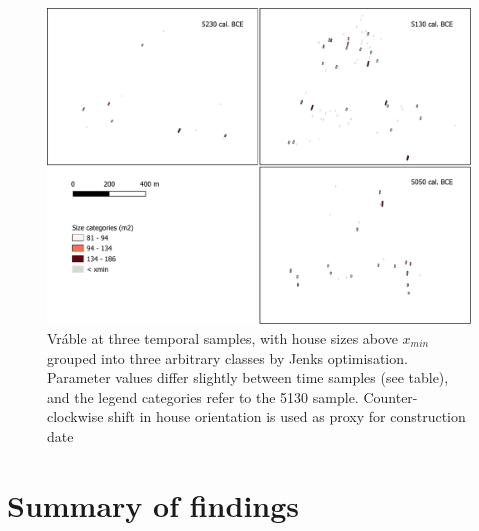 \documentclass[
  12pt,
  a4paper, twoside]{book}
\begin{document}
\begin{figure}

{\centering \includegraphics[width=0.9\linewidth]{Results/fig06_vrable_time} 

}

\caption[Settlement plan of Vráble at three time samples, with power-law houses]{Vráble at three temporal samples, with house sizes above \(x_{min}\) grouped into three arbitrary classes by Jenks optimisation. Parameter values differ slightly between time samples (see table), and the legend categories refer to the 5130 sample. Counter-clockwise shift in house orientation is used as proxy for construction date}\label{fig:06-vrable-time-map}
\end{figure}

\FloatBarrier

\hypertarget{summary-of-findings}{%
\section{Summary of findings}\label{summary-of-findings}}
\end{document}
